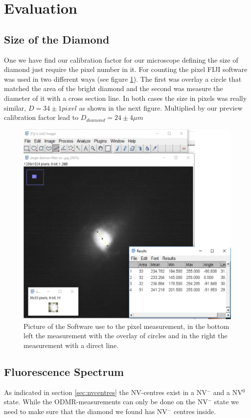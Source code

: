 \section{Evaluation}
\subsection{Size of the Diamond}

One we have find our calibration factor for our microscope defining the size of  diamond just require the pixel number in it. For counting the pixel FIJI software was used in two different ways (see figure \ref{fig:diasize4}). The first was overlay a circle that matched the area of the bright diamond and the second was measure the diameter of it with a cross section line. In both cases the size in pixels was really similar, $D=34\pm1 pixel$ as shown in the next figure. Multiplied by our preview calibration factor lead to $D_{diamond}=24\pm4 \mu m$
\begin{figure}
	\centering
	\includegraphics[width=0.7\linewidth]{../figures/Diasize4}
	\caption[sizediam]{Picture of the Software use to the pixel measurement, in the bottom left the measurement with the overlay of circles and in the right the measurement with a direct line.}
	\label{fig:diasize4}
\end{figure}


\subsection{Fluorescence Spectrum}

As indicated in section \ref{sec:nvcentres} the NV-centres exist in a NV$^-$ and a NV$^0$ state. While the ODMR-measurements can only be done on the NV$^-$ state we need to make sure that the diamond we found has NV$^-$ centres inside.\\

